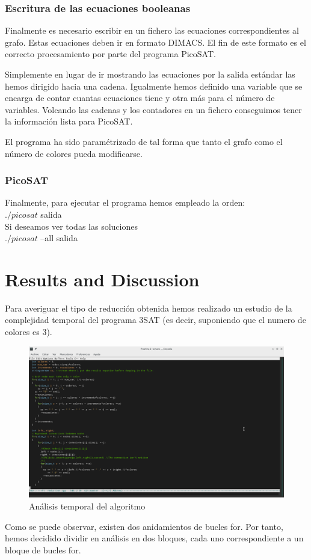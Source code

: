\documentclass{article}
\begin{document}
    \subsubsection{Escritura de las ecuaciones booleanas}
        Finalmente es necesario escribir en un fichero las ecuaciones correspondientes al grafo. Estas 
        ecuaciones deben ir en formato DIMACS. El fin de este formato es el correcto procesamiento por parte del 
        programa PicoSAT. 

        Simplemente en lugar de ir mostrando las ecuaciones por la salida estándar las hemos dirigido hacia una cadena. Igualmente 
        hemos definido una variable que se encarga de contar cuantas ecuaciones tiene y otra más para el número de variables. 
        Volcando las cadenas y los contadores en un fichero conseguimos tener la información lista para PicoSAT.

        El programa ha sido paramétrizado de tal forma que tanto el grafo como el número de colores pueda modificarse.  
    
    \subsubsection{PicoSAT}
        Finalmente, para ejecutar el programa hemos empleado la orden: \\
         \vspace{5mm} $./picosat$ salida \\

        Si deseamos ver todas las soluciones \\
         \vspace{5mm} $./picosat$ --all salida


\section{Results and Discussion}
    Para averiguar el tipo de reducción obtenida hemos realizado un estudio de la complejidad temporal del programa 3SAT (es decir, 
    suponiendo que el numero de colores es 3). 
    \begin{figure}[H]
        \centering
        \includegraphics[width=1\textwidth]{pictures/analisis.png}
        \caption{Análisis temporal del algoritmo}
    \end{figure}
    Como se puede observar, existen dos anidamientos de bucles for. Por tanto, hemos decidido dividir en análisis en dos bloques, 
    cada uno correspondiente a un bloque de bucles for. 
\end{document}

